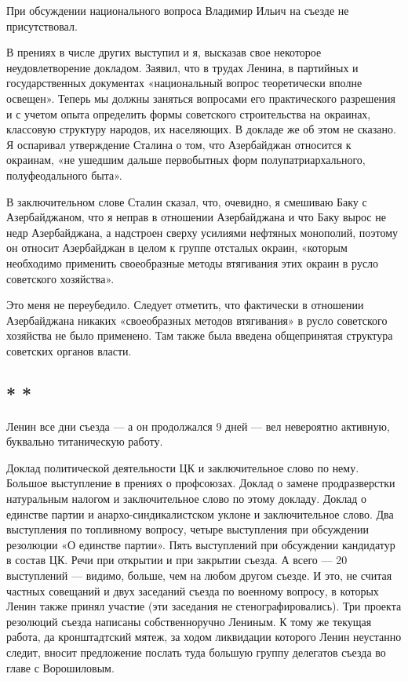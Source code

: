 \documentclass[12pt, a4paper, openany]{book}
\begin{document}
При обсуждении национального вопроса Владимир Ильич на съезде не присутствовал.

В прениях в числе других выступил и я, высказав свое некоторое неудовлетворение докладом. Заявил, что в трудах Ленина, в партийных и государственных документах «национальный вопрос теоретически вполне освещен». Теперь мы должны заняться вопросами его практического разрешения и с учетом опыта определить формы советского строительства на окраинах, классовую структуру народов, их населяющих. В докладе же об этом не сказано. Я оспаривал утверждение Сталина о том, что Азербайджан относится к окраинам, «не ушедшим дальше первобытных форм полупатриархального, полуфеодального быта».

В заключительном слове Сталин сказал, что, очевидно, я смешиваю Баку с Азербайджаном, что я неправ в отношении Азербайджана и что Баку вырос не недр Азербайджана, а надстроен сверху усилиями нефтяных монополий, поэтому он относит Азербайджан в целом к группе отсталых окраин, «которым необходимо применить своеобразные методы втягивания этих окраин в русло советского хозяйства».

Это меня не переубедило. Следует отметить, что фактически в отношении Азербайджана никаких «своеобразных методов втягивания» в русло советского хозяйства не было применено. Там также была введена общепринятая структура советских органов власти.

\subsection*{\center * * *}

Ленин все дни съезда — а он продолжался 9 дней — вел невероятно активную, буквально титаническую работу.

Доклад политической деятельности ЦК и заключительное слово по нему. Большое выступление в прениях о профсоюзах. Доклад о замене продразверстки натуральным налогом и заключительное слово по этому докладу. Доклад о единстве партии и анархо-синдикалистском уклоне и заключительное слово. Два выступления по топливному вопросу, четыре выступления при обсуждении резолюции «О единстве партии». Пять выступлений при обсуждении кандидатур в состав ЦК. Речи при открытии и при закрытии съезда. А всего — 20 выступлений — видимо, больше, чем на любом другом съезде. И это, не считая частных совещаний и двух заседаний съезда по военному вопросу, в которых Ленин также принял участие (эти заседания не стенографировались). Три проекта резолюций съезда написаны собственноручно Лениным. К тому же текущая работа, да кронштадтский мятеж, за ходом ликвидации которого Ленин неустанно следит, вносит предложение послать туда большую группу делегатов съезда во главе с Ворошиловым.
\end{document}
